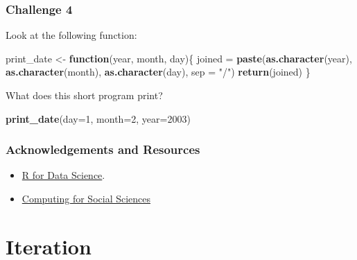 \documentclass[]{book}
\newenvironment{Shaded}{\begin{snugshade}}{\end{snugshade}}
\newcommand{\ControlFlowTok}[1]{\textcolor[rgb]{0.13,0.29,0.53}{\textbf{#1}}}
\newcommand{\DataTypeTok}[1]{\textcolor[rgb]{0.13,0.29,0.53}{#1}}
\newcommand{\DecValTok}[1]{\textcolor[rgb]{0.00,0.00,0.81}{#1}}
\newcommand{\KeywordTok}[1]{\textcolor[rgb]{0.13,0.29,0.53}{\textbf{#1}}}
\newcommand{\NormalTok}[1]{#1}
\newcommand{\StringTok}[1]{\textcolor[rgb]{0.31,0.60,0.02}{#1}}
\providecommand{\tightlist}{%
  \setlength{\itemsep}{0pt}\setlength{\parskip}{0pt}}
\begin{document}
\hypertarget{challenge-4}{%
\subsubsection*{Challenge 4}\label{challenge-4}}

Look at the following function:

\begin{Shaded}
\begin{Highlighting}[]
\NormalTok{print_date <-}\StringTok{ }\ControlFlowTok{function}\NormalTok{(year, month, day)\{}
\NormalTok{    joined =}\StringTok{ }\KeywordTok{paste}\NormalTok{(}\KeywordTok{as.character}\NormalTok{(year), }\KeywordTok{as.character}\NormalTok{(month), }\KeywordTok{as.character}\NormalTok{(day), }\DataTypeTok{sep =} \StringTok{"/"}\NormalTok{)}
    \KeywordTok{return}\NormalTok{(joined)}
\NormalTok{\}}
\end{Highlighting}
\end{Shaded}

What does this short program print?

\begin{Shaded}
\begin{Highlighting}[]
\KeywordTok{print_date}\NormalTok{(}\DataTypeTok{day=}\DecValTok{1}\NormalTok{, }\DataTypeTok{month=}\DecValTok{2}\NormalTok{, }\DataTypeTok{year=}\DecValTok{2003}\NormalTok{)}
\end{Highlighting}
\end{Shaded}

\hypertarget{acknowledgements-and-resources}{%
\subsubsection*{Acknowledgements and Resources}\label{acknowledgements-and-resources}}

\begin{itemize}
\tightlist
\item
  \href{https://r4ds.had.co.nz/functions.html}{R for Data Science}.
\item
  \href{https://cfss.uchicago.edu/notes/functions}{Computing for Social Sciences}
\end{itemize}

\hypertarget{iteration}{%
\section{Iteration}\label{iteration}}
\end{document}
